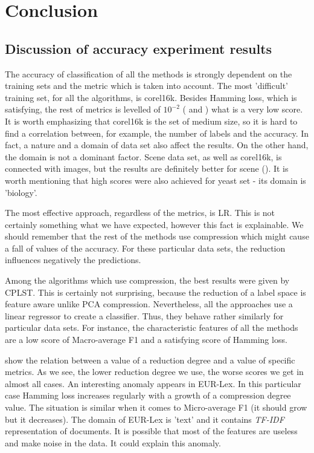 \chapter{Conclusion}

\section{Discussion of accuracy experiment results}

The accuracy of classification of all the methods is strongly dependent on the training sets and the metric which is taken into account. The most 'difficult' training set, for all the algorithms, is corel16k. Besides Hamming loss, which is satisfying, the rest of metrics is levelled of $10^{-2}$ ( and ) what is a very low score. It is worth emphasizing that corel16k is the set of medium size, so it is hard to find a correlation between, for example, the number of labels and the accuracy. In fact, a nature and a domain of data set also affect the results. On the other hand, the domain is not a dominant factor. Scene data set, as well as corel16k, is connected with images, but the results are definitely better for scene (). It is worth mentioning that high scores were also achieved for yeast set - its domain is 'biology'.

The most effective approach, regardless of the metrics, is LR. This is not certainly something what we have expected, however this fact is explainable. We should remember that the rest of the methods use compression which might cause a fall of values of the accuracy. For these particular data sets, the reduction influences negatively the predictions. 

Among the algorithms which use compression, the best results were given by CPLST. This is certainly not surprising, because the reduction of a label space is feature aware unlike PCA compression. Nevertheless, all the approaches use a linear regressor to create a classifier. Thus, they behave rather similarly for particular data sets. For instance, the characteristic features of all the methods are a low score of Macro-average F1 and a satisfying score of Hamming loss. 

 show the relation between a value of a reduction degree and a value of specific metrics. As we see, the lower reduction degree we use, the worse scores we get in almost all cases. An interesting anomaly appears in EUR-Lex. In this particular case Hamming loss increases regularly with a growth of a compression degree value. The situation is similar when it comes to Micro-average F1 (it should grow but it decreases). The domain of EUR-Lex is 'text' and it contains \textit{TF-IDF} representation of documents. It is possible that most of the features are useless and make noise in the data. It could explain this anomaly.  

